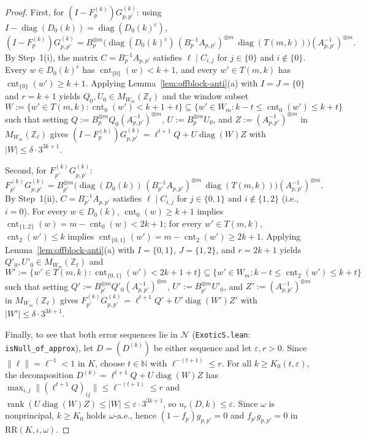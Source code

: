 \documentclass[11pt]{article}
\theoremstyle{definition}
\theoremstyle{remark}
\numberwithin{equation}{section}
\DeclareMathOperator{\rank}{rank}
\DeclareMathOperator{\diag}{diag}
\DeclareMathOperator{\cnt}{cnt}
\newcommand{\RR}{\mathrm{RR}}
\newcommand{\Z}{\mathbb{Z}}
\newcommand{\N}{\mathbb{N}}
\newcommand{\NN}{\mathcal{N}}
\newcommand{\1}{\mathbf{1}}
\newcommand{\code}[1]{{\normalfont\small\texttt{#1}}}
\begin{document}
\begin{proof}
First, for $(I - F_p^{(k)}) G_{p,p'}^{(k)}$: using $I - \diag(D_0(k)) = \diag(D_0(k)^c)$,
\[
(I - F_p^{(k)}) G_{p,p'}^{(k)}
= B_p^{\otimes m} \bigl(\diag(D_0(k)^c)\, (B_p^{-1} A_{p,p'})^{\otimes m}\, \diag(T(m,k))\bigr) (A_{p,p'}^{-1})^{\otimes m}.
\]
By Step~1(i), the matrix $C = B_p^{-1} A_{p,p'}$ satisfies $\ell \mid C_{i,j}$ for $j \in \{0\}$ and $i \notin \{0\}$. Every $w \in D_0(k)^c$ has $\cnt_{\{0\}}(w) < k + 1$, and every $w' \in T(m, k)$ has $\cnt_{\{0\}}(w') \ge k + 1$. Applying Lemma~\ref{lem:offblock-anti}(a) with $I = J = \{0\}$ and $r = k + 1$ yields $Q_0, U_0 \in M_{W_m}(\Z_\ell)$ and the window subset
\[
W := \{w' \in T(m, k) : \cnt_0(w') < k + 1 + t\} \subseteq \{w' \in W_m : k - t \le \cnt_0(w') \le k + t\}
\]
such that setting $Q := B_p^{\otimes m} Q_0 (A_{p,p'}^{-1})^{\otimes m}$, $U := B_p^{\otimes m} U_0$, and $Z := (A_{p,p'}^{-1})^{\otimes m}$ in $M_{W_m}(\Z_\ell)$ gives $(I - F_p^{(k)}) G_{p,p'}^{(k)} = \ell^{t+1} Q + U \diag(W) Z$ with $|W| \le \delta \cdot 3^{3k+1}$.

Second, for $F_{p'}^{(k)} G_{p,p'}^{(k)}$:
\[
F_{p'}^{(k)} G_{p,p'}^{(k)}
= B_{p'}^{\otimes m} \bigl(\diag(D_0(k))\, (B_{p'}^{-1} A_{p,p'})^{\otimes m}\, \diag(T(m,k))\bigr) (A_{p,p'}^{-1})^{\otimes m}.
\]
By Step~1(ii), $C = B_{p'}^{-1} A_{p,p'}$ satisfies $\ell \mid C_{i,j}$ for $j \in \{0, 1\}$ and $i \notin \{1, 2\}$ (i.e., $i = 0$). For every $w \in D_0(k)$, $\cnt_0(w) \ge k + 1$ implies $\cnt_{\{1,2\}}(w) = m - \cnt_0(w) < 2k + 1$; for every $w' \in T(m, k)$, $\cnt_2(w') \le k$ implies $\cnt_{\{0,1\}}(w') = m - \cnt_2(w') \ge 2k + 1$. Applying Lemma~\ref{lem:offblock-anti}(a) with $I = \{0,1\}$, $J = \{1,2\}$, and $r = 2k + 1$ yields $Q'_0, U'_0 \in M_{W_m}(\Z_\ell)$ and
\[
W' := \{w' \in T(m, k) : \cnt_{\{0,1\}}(w') < 2k + 1 + t\} \subseteq \{w' \in W_m : k - t \le \cnt_2(w') \le k + t\}
\]
such that setting $Q' := B_{p'}^{\otimes m} Q'_0 (A_{p,p'}^{-1})^{\otimes m}$, $U' := B_{p'}^{\otimes m} U'_0$, and $Z' := (A_{p,p'}^{-1})^{\otimes m}$ in $M_{W_m}(\Z_\ell)$ gives $F_{p'}^{(k)} G_{p,p'}^{(k)} = \ell^{t+1} Q' + U' \diag(W') Z'$ with $|W'| \le \delta \cdot 3^{3k+1}$.

Finally, to see that both error sequences lie in $\NN$ (\code{ExoticS.lean}: \code{isNull\_of\_approx}), let $D = (D^{(k)})$ be either sequence and let $\varepsilon, r > 0$. Since $\|\ell\| = \ell^{-1} < 1$ in $K$, choose $t \in \N$ with $\ell^{-(t+1)} \le r$. For all $k \ge K_0(t, \varepsilon)$, the decomposition $D^{(k)} = \ell^{t+1} Q + U \diag(W) Z$ has $\max_{i,j}\|(\ell^{t+1} Q)_{ij}\| \le \ell^{-(t+1)} \le r$ and $\rank(U \diag(W) Z) \le |W| \le \varepsilon \cdot 3^{3k+1}$, so $u_r(D, k) \le \varepsilon$. Since $\omega$ is nonprincipal, $k \ge K_0$ holds $\omega$-a.e., hence $(1 - f_p) g_{p,p'} = 0$ and $f_{p'} g_{p,p'} = 0$ in $\RR(K, \iota, \omega)$.
\end{proof}
\end{document}
